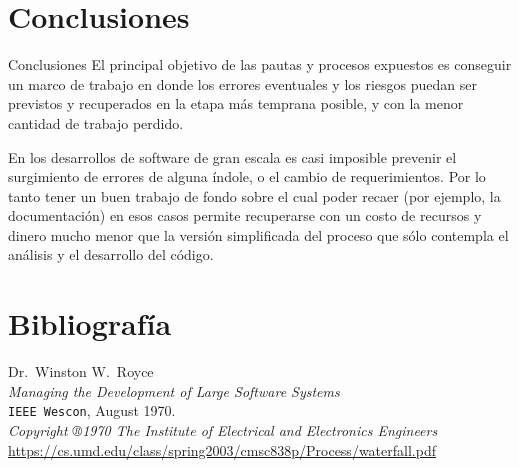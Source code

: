 \documentclass{beamer}
\begin{document}
\section{Conclusiones}
\begin{frame}{Conclusiones}
El principal objetivo de las pautas y procesos expuestos es conseguir un marco de trabajo en donde los errores eventuales y los riesgos puedan ser previstos y recuperados en la etapa más temprana posible, y con la menor cantidad de trabajo perdido.

\vspace{1em}

En los desarrollos de software de gran escala es casi imposible prevenir el surgimiento de errores de alguna índole, o el cambio de requerimientos.
Por lo tanto tener un buen trabajo de fondo sobre el cual poder recaer (por ejemplo, la documentación) en esos casos permite recuperarse con un costo de recursos y dinero mucho menor que la versión simplificada del proceso que sólo contempla el análisis y el desarrollo del código.
\end{frame}


\section{Bibliografía}

\begin{frame}[fragile]
\begin{thebibliography}{9}
  \footnotesize
  Dr.\ Winston W.\ Royce \\
  \emph{Managing the Development of Large Software Systems} \\
  \texttt{IEEE Wescon},
  August 1970. \\
  \textit{Copyright ®1970 The Institute of Electrical and Electronics Engineers} \\
  {\scriptsize\url{https://cs.umd.edu/class/spring2003/cmsc838p/Process/waterfall.pdf}}
\end{thebibliography}
\end{frame}
\end{document}
